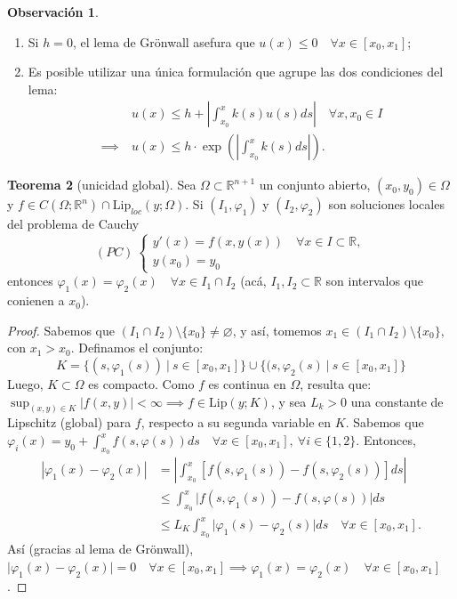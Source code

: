 \documentclass[11pt]{article}
\theoremstyle{definition} %
\newtheorem{theorem}{Teorema}[section]
\newtheorem{remark}[theorem]{Observación}
\newcommand{\R}{\mathbb{R}}
\begin{document}
\begin{remark}~
	\begin{enumerate}
		\item Si $h=0$, el lema de Grönwall asefura que $u(x) \leq 0 \quad \forall x \in [x_{0},x_{1}]$;

		\item Es posible utilizar una única formulación que agrupe las dos condiciones del lema:
		\begin{align*}
			& u(x) \leq h + \left| \int_{x_{0}}^{x}k(s)u(s)ds \right| \quad \forall x,x_{0}\in I \\
			\implies \ & u(x) \leq h \cdot \exp \left( \left| \int_{x_{0}}^{x} k(s)ds \right| \right)
		.\end{align*}
	\end{enumerate}
\end{remark}

\begin{theorem}[unicidad global]
	Sea $\Omega \subset \R^{n+1}$ un conjunto abierto, $(x_{0},y_{0}) \in \Omega$ y $f \in C(\Omega;\R^n) \cap \text{Lip}_{loc}(y;\Omega)$. Si $(I_1,\varphi_1)$ y $(I_2,\varphi_{2})$ son soluciones locales del problema de Cauchy
	\[ (PC) \ \begin{cases}
		y'(x) = f(x,y(x)) \quad \forall x \in I \subset \R, \\
		y(x_{0}) = y_{0}
	\end{cases} \]
	entonces $\varphi_{1}(x) = \varphi_{2}(x)\quad \forall x \in I_1 \cap I_2$ (acá, $I_1,I_{2} \subset \R$ son intervalos que conienen a $x_{0}$).
\end{theorem}
\begin{proof}
	Sabemos que $(I_1 \cap I_{2}) \setminus \{x_{0}\} \neq \varnothing$, y así, tomemos $x_{1} \in (I_{1} \cap I_{2}) \setminus \{x_{0}\}$, con $x_{1} > x_{0}$. Definamos el conjunto:
	\[ K = \{ (s,\varphi_{1}(s)) \ \big| \ s \in [x_{0},x_{1}] \} \cup \{ (s,\varphi_{2}(s) \ \big| \ s \in [x_{0},x_{1}] \} \] 
	Luego, $K \subset \Omega$ es compacto. Como $f$ es continua en $\Omega$, resulta que: $\sup_{(x,y) \in K} |f(x,y)| < \infty \implies f \in \text{Lip}(y;K)$, y sea $L_k > 0$ una constante de Lipschitz (global) para $f$, respecto a su segunda variable en $K$. Sabemos que $\varphi_{i}(x) = y_0 + \int_{x_{0}}^{x} f(s,\varphi(s))ds \quad \forall x \in [x_0,x_{1}],\ \forall i \in \{1,2\}$. Entonces,
	\begin{align*}
		|\varphi_{1}(x) - \varphi_{2}(x)| &= \left| \int_{x_{0}}^{x} [f(s,\varphi_{1}(s)) - f(s,\varphi_{2}(s))]ds \right| \\
		& \leq \int_{x_{0}}^{x} \big|f(s,\varphi_{1}(s)) - f(s,\varphi(s))\big| ds \\
		& \leq L_K \int_{x_{0}}^{x} \big| \varphi_{1}(s) - \varphi_{2}(s) \big| ds \quad \forall x \in [x_{0},x_{1}]
	.\end{align*}
	Así (gracias al lema de Grönwall), $\big| \varphi_{1}(x) - \varphi_{2}(x) \big| = 0 \quad \forall x \in [x_{0},x_{1}] \implies \varphi_{1}(x) = \varphi_{2}(x) \quad \forall x \in [x_{0},x_{1}]$.
\end{proof}
\end{document}
